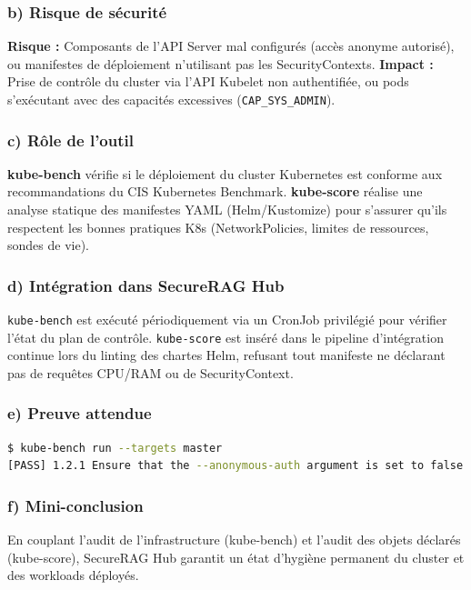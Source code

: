 \subsubsection{b) Risque de sécurité}
\textbf{Risque :} Composants de l'API Server mal configurés (accès anonyme autorisé), ou manifestes de déploiement n'utilisant pas les SecurityContexts.
\textbf{Impact :} Prise de contrôle du cluster via l'API Kubelet non authentifiée, ou pods s'exécutant avec des capacités excessives (\texttt{CAP\_SYS\_ADMIN}).

\subsubsection{c) Rôle de l'outil}
\textbf{kube-bench} vérifie si le déploiement du cluster Kubernetes est conforme aux recommandations du CIS Kubernetes Benchmark. 
\textbf{kube-score} réalise une analyse statique des manifestes YAML (Helm/Kustomize) pour s'assurer qu'ils respectent les bonnes pratiques K8s (NetworkPolicies, limites de ressources, sondes de vie).

\subsubsection{d) Intégration dans SecureRAG Hub}
\texttt{kube-bench} est exécuté périodiquement via un CronJob privilégié pour vérifier l'état du plan de contrôle. \texttt{kube-score} est inséré dans le pipeline d'intégration continue lors du linting des chartes Helm, refusant tout manifeste ne déclarant pas de requêtes CPU/RAM ou de SecurityContext.

\subsubsection{e) Preuve attendue}
\begin{lstlisting}[language=bash, caption={Exécution de kube-bench sur un nœud master}, label={lst:kube_bench_proof}]
$ kube-bench run --targets master
[PASS] 1.2.1 Ensure that the --anonymous-auth argument is set to false
\end{lstlisting}

\subsubsection{f) Mini-conclusion}
En couplant l'audit de l'infrastructure (kube-bench) et l'audit des objets déclarés (kube-score), SecureRAG Hub garantit un état d'hygiène permanent du cluster et des workloads déployés.

